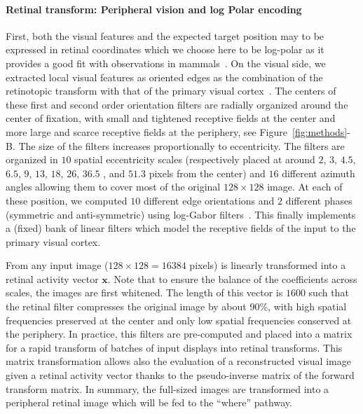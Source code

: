 \paragraph{Retinal transform: Peripheral vision and log Polar encoding}
First, both the visual features and the expected target position may to be expressed in retinal coordinates which we choose here to be log-polar as it provides a good fit with observations in mammals~\citep{Traver10}. On the visual side, we extracted local visual features as oriented edges  as the combination of the retinotopic transform with that of the primary visual cortex~\citep{Fischer2007a}. The centers of these first and second order orientation filters are radially organized around the center of fixation, with small and tightened receptive fields at the center and more large and scarce receptive fields at the periphery, see  Figure~\ref{fig:methods}-B. The size of the filters increases proportionally to eccentricity. The filters are organized in $10$ spatial eccentricity scales (respectively placed at around $2$, $3$, $4.5$, $6.5$, $9$, $13$, $18$, $26$, $36.5$ , and $51.3$ pixels from the center) and $16$ different azimuth angles allowing them to cover most of the original $128 \times 128 $ image. At each of these position, we computed $10$ different edge orientations and $2$ different phases (symmetric and anti-symmetric) using log-Gabor filters~\citep{Fischer2007a}. This finally implements a (fixed) bank of linear filters which model the receptive fields of the input to the primary visual cortex.

From any input image ($128\times 128=16384$ pixels) is linearly transformed into a retinal activity vector $\boldsymbol{x}$. Note that to ensure the balance of the coefficients across scales, the images are first whitened. The length of this vector is $1600$ such that the retinal filter compresses the original image by about 90\%, with high spatial frequencies preserved at the center and only low spatial frequencies conserved at the periphery. \ICANN In practice, this filters are pre-computed and placed into a matrix for a rapid transform of batches of input displays into retinal transforms. This matrix transformation allows also the evaluation of a reconstructed visual image given a retinal activity vector thanks to the pseudo-inverse matrix of the forward transform matrix. In summary, the full-sized images are transformed into a peripheral retinal image which will be fed to the ``where'' pathway.\fi

